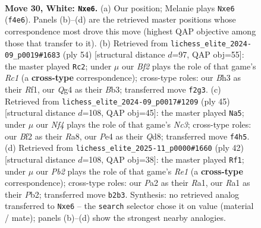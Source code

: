 \documentclass[11pt]{article}
\begin{document}
\begin{figure}[p]
\label{fig:thought-m56}
\end{figure}

\clearpage

\begin{figure}[p]\centering
\begin{subfigure}{0.46\textwidth}\centering
\resizebox{\linewidth}{!}{%
\newchessgame
\chessboard[
  setfen={r3k2r/1q1b2bp/p1npp1p1/4p1P1/1p2PNQP/5P1B/PPPK1B2/R1R5 w - - 1 30},
  showmover=false,
  pgfstyle=straightmove, color=movearrow, markmove={f4-e6}
]}
\caption{}
\end{subfigure}\hfill
\begin{subfigure}{0.46\textwidth}\centering
\resizebox{\linewidth}{!}{%
\newchessgame
\chessboard[
  setfen={r3r1k1/1b1q2p1/p3n2p/Bp1pPp2/3p1P2/PB1P1Q1P/1P4PK/2R2R2 w - - 16 28},
  showmover=false,
  pgfstyle=straightmove, color=movearrow, markmove={c1-c2}
]}
\caption{}
\end{subfigure}
\\[4pt]
\begin{subfigure}{0.46\textwidth}\centering
\resizebox{\linewidth}{!}{%
\newchessgame
\chessboard[
  setfen={r2q3r/1b2bpk1/2n1p1pp/1PPpP3/5P2/p3BN2/P2QB1PP/2R2R1K b - - 0 23},
  showmover=false,
  pgfstyle=straightmove, color=movearrow, markmove={c6-a5}
]}
\caption{}
\end{subfigure}\hfill
\begin{subfigure}{0.46\textwidth}\centering
\resizebox{\linewidth}{!}{%
\newchessgame
\chessboard[
  setfen={1r3r1k/2pb1pq1/1b1p3p/1p1Bp2n/4P1pN/2PP2B1/1P3PPP/R2QR2K w - - 1 22},
  showmover=false,
  pgfstyle=straightmove, color=movearrow, markmove={e1-f1}
]}
\caption{}
\end{subfigure}
\caption{\textbf{Move 30, White: \texttt{Nxe6}.} (a) Our position; Melanie plays \texttt{Nxe6} (\texttt{f4e6}). Panels (b)--(d) are the retrieved master positions whose correspondence most drove this move (highest QAP objective among those that transfer to it). (b) Retrieved from \texttt{lichess\_elite\_2024-09\_p0019\#1683} (ply 54) [structural distance $d$=97, QAP obj=55]: the master played \texttt{Rc2}; under $\mu$ our \emph{Bf2} plays the role of that game's \emph{Rc1} (a \textbf{cross-type} correspondence); cross-type roles: our \emph{B}h3 as their \emph{R}f1, our \emph{Q}g4 as their \emph{B}b3; transferred move \texttt{f2g3}. (c) Retrieved from \texttt{lichess\_elite\_2024-09\_p0017\#1209} (ply 45) [structural distance $d$=108, QAP obj=45]: the master played \texttt{Na5}; under $\mu$ our \emph{Nf4} plays the role of that game's \emph{Nc3}; cross-type roles: our \emph{B}f2 as their \emph{R}a8, our \emph{P}e4 as their \emph{Q}d8; transferred move \texttt{f4h5}. (d) Retrieved from \texttt{lichess\_elite\_2025-11\_p0000\#1660} (ply 42) [structural distance $d$=108, QAP obj=38]: the master played \texttt{Rf1}; under $\mu$ our \emph{Pb2} plays the role of that game's \emph{Re1} (a \textbf{cross-type} correspondence); cross-type roles: our \emph{P}a2 as their \emph{R}a1, our \emph{R}a1 as their \emph{P}b2; transferred move \texttt{b2b3}. Synthesis: no retrieved analog transferred to \texttt{Nxe6} -- the \texttt{search} selector chose it on value (material / mate); panels (b)--(d) show the strongest nearby analogies.}

\end{figure}
\end{document}
